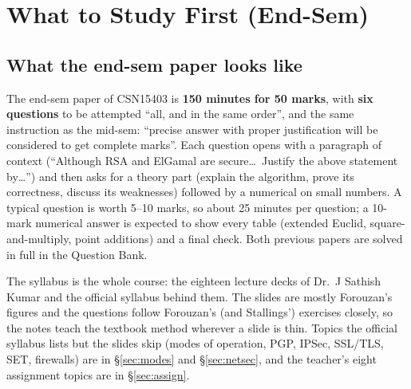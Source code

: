 \section{What to Study First (End-Sem)}\label{sec:roadmap}

\subsection{What the end-sem paper looks like}
The end-sem paper of CSN15403 is \textbf{150 minutes for 50 marks}, with \textbf{six questions} to be attempted ``all, and in the same order'', and the same instruction as the mid-sem: ``precise answer with proper justification will be considered to get complete marks''. Each question opens with a paragraph of context (``Although RSA and ElGamal are secure\dots\ Justify the above statement by\dots'') and then asks for a theory part (explain the algorithm, prove its correctness, discuss its weaknesses) followed by a numerical on small numbers. A typical question is worth 5--10 marks, so about 25 minutes per question; a 10-mark numerical answer is expected to show every table (extended Euclid, square-and-multiply, point additions) and a final check. Both previous papers are solved in full in the Question Bank.

The syllabus is the whole course: the eighteen lecture decks of Dr.\ J Sathish Kumar and the official syllabus behind them. The slides are mostly Forouzan's figures and the questions follow Forouzan's (and Stallings') exercises closely, so the notes teach the textbook method wherever a slide is thin. Topics the official syllabus lists but the slides skip (modes of operation, PGP, IPSec, SSL/TLS, SET, firewalls) are in \S\ref{sec:modes} and \S\ref{sec:netsec}, and the teacher's eight assignment topics are in \S\ref{sec:assign}.

